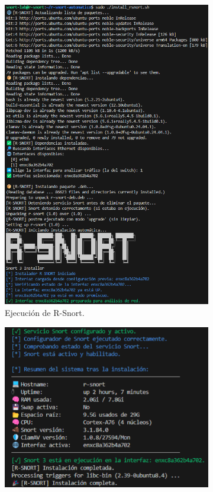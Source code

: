 \documentclass[11pt,a4paper,twoside]{report}
\begin{document}
\begin{figure}[H]
	\centering
	\begin{subfigure}[b]{0.48\textwidth}
		\centering
		\includegraphics[scale=0.35]{script_automatico/14.png}
		\caption{Ejecución de R-Snort.}
		\label{fig:ejecucion}
	\end{subfigure}
	\hfill
	\begin{subfigure}[b]{0.48\textwidth}
		\centering
		\includegraphics[scale=0.35]{pruebas_config/10-10.png}

\end{subfigure}
\end{figure}
\end{document}
